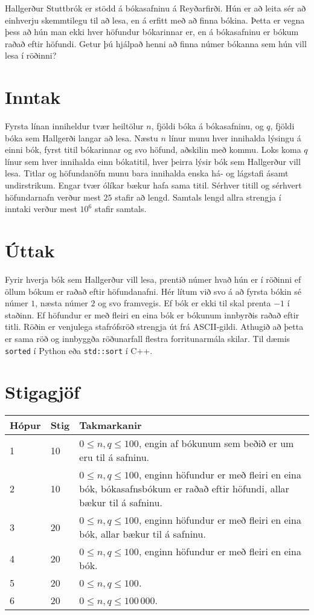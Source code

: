 
Hallgerður Stuttbrók er stödd á bókasafninu á Reyðarfirði. 
Hún er að leita sér að einhverju skemmtilegu til að lesa, en á erfitt með að finna bókina.
Þetta er vegna þess að hún man ekki hver höfundur bókarinnar er, en á bókasafninu er bókum raðað eftir höfundi.
Getur þú hjálpað henni að finna númer bókanna sem hún vill lesa í röðinni?

\section*{Inntak}
Fyrsta línan inniheldur tvær heiltölur $n$, fjöldi bóka á bókasafninu, og $q$, fjöldi bóka sem Hallgerði langar að lesa.
Næstu $n$ línur munu hver innihalda lýsingu á einni bók, fyrst titil bókarinnar og svo höfund, aðskilin með kommu.
Loks koma $q$ línur sem hver innihalda einn bókatitil, hver þeirra lýsir bók sem Hallgerður vill lesa.
Titlar og höfundanöfn munu bara innihalda enska há- og lágstafi ásamt undirstrikum.
Engar tvær ólíkar bækur hafa sama titil.
Sérhver titill og sérhvert höfundarnafn verður mest $25$ stafir að lengd.
Samtals lengd allra strengja í inntaki verður mest $10^6$ stafir samtals.

\section*{Úttak}
Fyrir hverja bók sem Hallgerður vill lesa, prentið númer hvað hún er í röðinni ef öllum bókum er raðað eftir höfundanafni.
Hér lítum við svo á að fyrsta bókin sé númer $1$, næsta númer $2$ og svo framvegis.
Ef bók er ekki til skal prenta $-1$ í staðinn.
Ef höfundur er með fleiri en eina bók er bókunum innbyrðis raðað eftir titli.
Röðin er venjulega stafrófsröð strengja út frá ASCII-gildi.
Athugið að þetta er sama röð og innbyggða röðunarfall flestra forritunarmála skilar.
Til dæmis \texttt{sorted} í Python eða \texttt{std::sort} í C++.

\section*{Stigagjöf}
\begin{tabular}{|l|l|l|}
\hline
Hópur & Stig & Takmarkanir \\ \hline
1     & 10   & $0 \leq n, q \leq 100$, engin af bókunum sem beðið er um eru til á safninu. \\ \hline
2     & 10   & $0 \leq n, q \leq 100$, enginn höfundur er með fleiri en eina bók, bókasafnsbókum er raðað eftir höfundi, allar bækur til á safninu. \\ \hline
3     & 20   & $0 \leq n, q \leq 100$, enginn höfundur er með fleiri en eina bók, allar bækur til á safninu. \\ \hline
4     & 20   & $0 \leq n, q \leq 100$, enginn höfundur er með fleiri en eina bók. \\ \hline
5     & 20   & $0 \leq n, q \leq 100$. \\ \hline
6     & 20   & $0 \leq n, q \leq 100\,000$. \\ \hline
\end{tabular}

